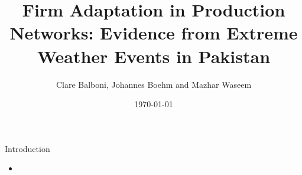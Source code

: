\documentclass{beamer}
\begin{document}
\title{Firm Adaptation in Production Networks: Evidence from Extreme Weather Events in Pakistan}
\author{Clare Balboni, Johannes Boehm and Mazhar Waseem}

\date{\today}

\frame{\titlepage}


\begin{frame}{Introduction}
\begin{itemize}
    \item 
    
\end{itemize}

\end{frame}
\end{document}
